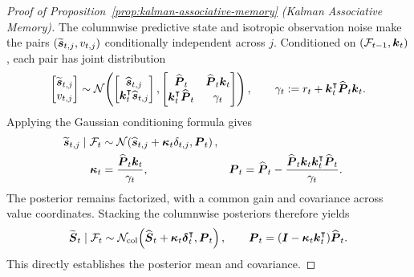 \documentclass[11pt,letterpaper,logo]{yalearxiv}
\begin{document}
\begin{proof}[Proof of Proposition~\ref{prop:kalman-associative-memory} (Kalman Associative Memory)]
The columnwise predictive state and isotropic observation noise make the pairs
$(\widetilde{\boldsymbol{s}}_{t,j},v_{t,j})$ conditionally independent across $j$. Conditioned on
$(\mathcal F_{t-1},\boldsymbol{k}_t)$, each pair has joint distribution
\begin{equation}
  \begin{bmatrix}
    \widetilde{\boldsymbol{s}}_{t,j} \\ v_{t,j}
  \end{bmatrix}
  \sim
  \mathcal N\!\left(
  \begin{bmatrix}
    \widehat{\boldsymbol{s}}_{t,j} \\ \boldsymbol{k}_t^{\intercal}\widehat{\boldsymbol{s}}_{t,j}
  \end{bmatrix},
  \begin{bmatrix}
    \widehat{\boldsymbol{P}}_t & \widehat{\boldsymbol{P}}_t\boldsymbol{k}_t \\
    \boldsymbol{k}_t^{\intercal}\widehat{\boldsymbol{P}}_t & \gamma_t
  \end{bmatrix}
  \right),
  \qquad
  \gamma_t:=r_t+\boldsymbol{k}_t^{\intercal}\widehat{\boldsymbol{P}}_t\boldsymbol{k}_t.
  \label{eq:kam-joint-column}
\end{equation}
Applying the Gaussian conditioning formula gives
\begin{equation}
\begin{aligned}
  \widetilde{\boldsymbol{s}}_{t,j}\mid\mathcal F_t
  &\sim
  \mathcal N\!\left(
    \widehat{\boldsymbol{s}}_{t,j}+\boldsymbol{\kappa}_t\delta_{t,j},
    \boldsymbol{P}_t
  \right), \\
  \boldsymbol{\kappa}_t
  &=\frac{\widehat{\boldsymbol{P}}_t\boldsymbol{k}_t}{\gamma_t},
  &
  \boldsymbol{P}_t
  &=\widehat{\boldsymbol{P}}_t
    -\frac{\widehat{\boldsymbol{P}}_t\boldsymbol{k}_t\boldsymbol{k}_t^{\intercal}\widehat{\boldsymbol{P}}_t}
    {\gamma_t}.
\end{aligned}
  \label{eq:kam-column-conditioning}
\end{equation}
The posterior remains factorized, with a common gain and covariance across value coordinates.
Stacking the columnwise posteriors therefore yields
\begin{equation}
  \widetilde{\boldsymbol{S}}_t\mid\mathcal F_t
  \sim
  \mathcal N_{\mathrm{col}}\!\left(
    \widehat{\boldsymbol{S}}_t+\boldsymbol{\kappa}_t\boldsymbol{\delta}_t^{\intercal},
    \boldsymbol{P}_t
  \right),
  \qquad
  \boldsymbol{P}_t
  =(\boldsymbol{I}-\boldsymbol{\kappa}_t\boldsymbol{k}_t^{\intercal})\widehat{\boldsymbol{P}}_t.
  \label{eq:kam-stacked-posterior}
\end{equation}
This directly establishes the posterior mean and covariance.


\end{proof}
\end{document}
